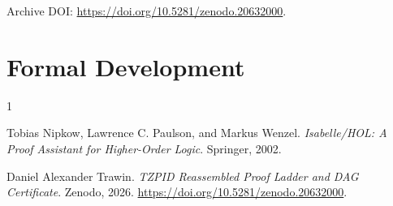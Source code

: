 \documentclass[11pt]{article}
\begin{document}
Archive DOI: \url{https://doi.org/10.5281/zenodo.20632000}.

\section{Formal Development}




\begin{thebibliography}{1}

Tobias Nipkow, Lawrence C. Paulson, and Markus Wenzel.
\newblock \emph{Isabelle/HOL: A Proof Assistant for Higher-Order Logic}.
\newblock Springer, 2002.

Daniel Alexander Trawin.
\newblock \emph{TZPID Reassembled Proof Ladder and DAG Certificate}.
\newblock Zenodo, 2026.
\newblock \url{https://doi.org/10.5281/zenodo.20632000}.

\end{thebibliography}
\end{document}
